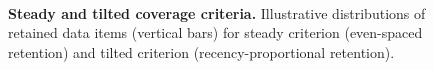 \begin{figure}
\begin{minipage}[t]{\linewidth}
    \begin{minipage}[]{\textwidth}
    \noindent{}%
    \hspace{-1.5ex}%
    {\vrule width 1pt}%
    \noindent{}%
    {\vrule width 1pt}%
    \noindent{}%
    \end{minipage}
\end{minipage}%
\begin{minipage}[t]{0.04\textwidth}
~
\end{minipage}

\begin{minipage}[t]{\linewidth}
    \vspace{-2ex}%
    \caption{%
      \textbf{Steady and tilted coverage criteria.}
      \footnotesize
      Illustrative distributions of retained data items (vertical bars) for steady criterion (even-spaced retention) and tilted criterion (recency-proportional retention).
      }
    \label{fig:criteria-intuition}
\end{minipage}
\end{figure}
